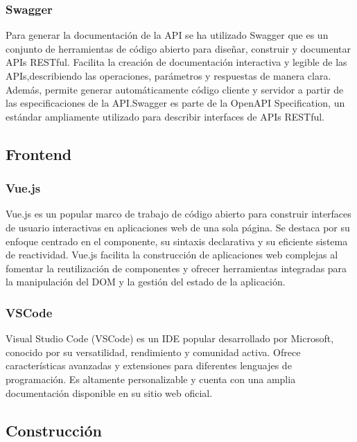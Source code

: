 \subsubsection{Swagger}
Para generar la documentación de la API se ha utilizado Swagger\cite{swagger} que es un conjunto de herramientas de código abierto para diseñar, construir y documentar APIs RESTful. Facilita la
creación de documentación interactiva y legible de las APIs,describiendo las operaciones, parámetros y respuestas de manera clara. Además, permite generar automáticamente código
cliente y servidor a partir de las especificaciones de la API.Swagger es parte de la OpenAPI Specification, un estándar ampliamente utilizado para describir interfaces de APIs
RESTful.



\subsection{Frontend}

\subsubsection{Vue.js}
Vue.js\cite{vue} es un popular marco de trabajo de código abierto para construir interfaces de usuario interactivas en aplicaciones web de una sola página.
Se destaca por su enfoque centrado en el componente, su sintaxis declarativa y su eficiente sistema de reactividad. Vue.js facilita la construcción
de aplicaciones web complejas al fomentar la reutilización de componentes y ofrecer herramientas integradas para la manipulación del DOM y la gestión
del estado de la aplicación.

\subsubsection{VSCode}
Visual Studio Code (VSCode) es un IDE popular desarrollado por Microsoft, conocido por su versatilidad, rendimiento y comunidad activa.
Ofrece características avanzadas y extensiones para diferentes lenguajes de programación. Es altamente personalizable y cuenta con una
amplia documentación disponible en su sitio web oficial.

\subsection{Construcción}

